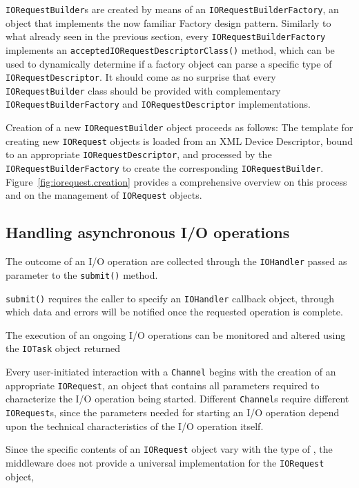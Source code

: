 \texttt{IORequestBuilder}s are created by means of an \texttt{IORequestBuilderFactory}, an object that implements the now familiar Factory design pattern. Similarly to what already seen in the previous section, every \texttt{IORequestBuilderFactory} implements an \texttt{acceptedIORequestDescriptorClass()} method, which can be used to dynamically determine if a factory object can parse a specific type of \texttt{IORequestDescriptor}.   It should come as no surprise that every \texttt{IORequestBuilder} class should be provided with complementary \texttt{IORequestBuilderFactory} and \texttt{IORequestDescriptor} implementations.

Creation of a new \texttt{IORequestBuilder} object proceeds as follows: The template for creating new \texttt{IORequest} objects is loaded from an XML Device Descriptor, bound to an appropriate \texttt{IORequestDescriptor}, and processed by the \texttt{IORequestBuilderFactory} to create the corresponding \texttt{IORequestBuilder}. Figure~\ref{fig:iorequest.creation} provides a comprehensive overview on this process and on the management of \texttt{IORequest} objects.


\subsection{Handling asynchronous I/O operations}

The outcome of an I/O operation are collected through the \texttt{IOHandler} passed as parameter to the \texttt{submit()} method. 

\texttt{submit()} requires the caller to specify an \texttt{IOHandler} callback object, through which data and errors will be notified once the requested operation is complete.

The execution of an ongoing I/O operations can be monitored and altered using the \texttt{IOTask} object returned 






Every user-initiated interaction with a \texttt{Channel} begins with the creation of an appropriate \texttt{IORequest}, an object that contains all parameters required to characterize the I/O operation being started. Different \texttt{Channel}s require different \texttt{IORequest}s, since the parameters needed for starting an I/O operation depend upon the technical characteristics of the I/O operation itself.

Since the specific contents of an \texttt{IORequest} object vary with the type of , the middleware does not provide a universal implementation for the \texttt{IORequest} object, 


